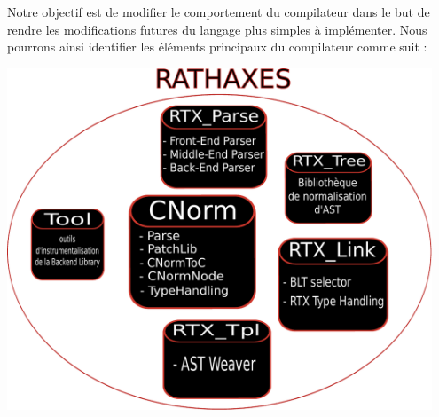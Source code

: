 \documentclass{rtxreport}
\begin{document}
Notre objectif est de modifier le comportement du compilateur dans le but de
rendre les modifications futures du langage plus simples à implémenter.
Nous pourrons ainsi identifier les éléments principaux du compilateur comme
suit :

\includegraphics[width=0.95\textwidth]{diagramme_architecture.pdf}
\end{document}
